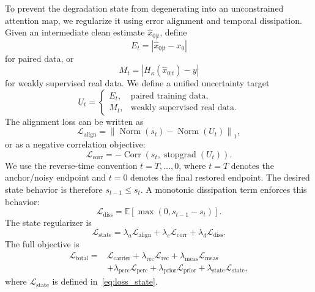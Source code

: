 \documentclass[journal]{IEEEtran}
\newcommand{\E}{\mathbb{E}}
\newcommand{\Norm}{\operatorname{Norm}}
\newcommand{\Corr}{\operatorname{Corr}}
\newcommand{\stopgrad}{\operatorname{stopgrad}}
\newcommand{\hk}{H_{\kappa}}
\begin{document}
To prevent the degradation state from degenerating into an unconstrained attention map, we regularize it using error alignment and temporal dissipation. Given an intermediate clean estimate $\hat{x}_{0|t}$, define
\begin{equation}
    E_t=|\hat{x}_{0|t}-x_0|
\end{equation}
for paired data, or
\begin{equation}
    M_t=|\hk(\hat{x}_{0|t})-y|
\end{equation}
for weakly supervised real data. We define a unified uncertainty target
\begin{equation}
U_t=\begin{cases}
E_t, & \text{paired training data},\\
M_t, & \text{weakly supervised real data}.
\end{cases}
\end{equation}
The alignment loss can be written as
\begin{equation}
    \mathcal{L}_{\mathrm{align}}=\left\|\Norm(s_t)-\Norm(U_t)\right\|_1,
    \label{eq:loss_align}
\end{equation}
or as a negative correlation objective:
\begin{equation}
    \mathcal{L}_{\mathrm{corr}}=-\Corr\left(s_t,\stopgrad(U_t)\right).
    \label{eq:loss_corr}
\end{equation}
We use the reverse-time convention $t=T,\ldots,0$, where $t=T$ denotes the anchor/noisy endpoint and $t=0$ denotes the final restored endpoint. The desired state behavior is therefore $s_{t-1}\le s_t$. A monotonic dissipation term enforces this behavior:
\begin{equation}
    \mathcal{L}_{\mathrm{diss}}=\E\left[\max(0,s_{t-1}-s_t)\right].
    \label{eq:loss_diss}
\end{equation}
The state regularizer is
\begin{equation}
\mathcal{L}_{\mathrm{state}}=\lambda_a\mathcal{L}_{\mathrm{align}}+\lambda_c\mathcal{L}_{\mathrm{corr}}+\lambda_d\mathcal{L}_{\mathrm{diss}}.
\label{eq:loss_state}
\end{equation}
The full objective is
\begin{equation}
\begin{split}
    \mathcal{L}_{\mathrm{total}}={}&\mathcal{L}_{\mathrm{carrier}}+
    \lambda_{\mathrm{rec}}\mathcal{L}_{\mathrm{rec}}+
    \lambda_{\mathrm{meas}}\mathcal{L}_{\mathrm{meas}} \\
    &+\lambda_{\mathrm{perc}}\mathcal{L}_{\mathrm{perc}}+
    \lambda_{\mathrm{prior}}\mathcal{L}_{\mathrm{prior}}+
    \lambda_{\mathrm{state}}\mathcal{L}_{\mathrm{state}},
\end{split}
    \label{eq:loss_total}
\end{equation}
where $\mathcal{L}_{\mathrm{state}}$ is defined in~\eqref{eq:loss_state}.
\end{document}
